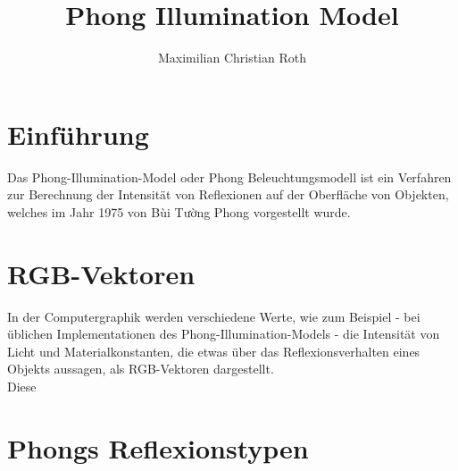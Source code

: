 \documentclass[a4paper]{scrartcl}%
\title{Phong Illumination Model}
\author{Maximilian Christian Roth}
\begin{document}

\maketitle
\tableofcontents

\newpage

\section{Einführung}%
\label{sec:einfuhrung}

    Das Phong-Illumination-Model oder Phong Beleuchtungsmodell ist ein Verfahren zur Berechnung der Intensität von Reflexionen auf der Oberfläche von Objekten,\\
    welches im Jahr 1975 von Bùi Tường Phong \footnotemark[1] vorgestellt wurde.\\

\section{RGB-Vektoren}%
\label{sec:rgb_vektoren}
    In der Computergraphik werden verschiedene Werte, wie zum Beispiel - bei üblichen Implementationen des Phong-Illumination-Models -
    die Intensität von Licht und Materialkonstanten, die etwas über das Reflexionsverhalten eines Objekts aussagen, als RGB-Vektoren dargestellt.\\
    Diese  

\section{Phongs Reflexionstypen}%
\label{sec:phongs_reflexionstypen}
\end{document}
